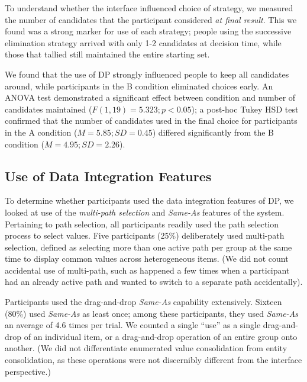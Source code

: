 \documentclass{sigchi}
\begin{document}
To understand whether the interface influenced choice of strategy, we measured the number of candidates that the participant considered \emph{at final result}.  This we found was a strong marker for use of each strategy; people using the successive elimination strategy arrived with only 1-2 candidates at decision time, while those that tallied still maintained the entire starting set.  

We found that the use of DP strongly influenced people to keep all candidates around, while participants in the B condition eliminated choices early.  An ANOVA test demonstrated a significant effect between condition and number of candidates maintained ($F(1,19)=5.323; p<0.05$); a post-hoc Tukey HSD test confirmed that the number of candidates used in the final choice for participants in the A condition ($M=5.85;SD=0.45$) differed significantly from the B condition ($M=4.95; SD=2.26$).

\subsection{Use of Data Integration Features}

To determine whether participants used the data integration features of DP, we looked at use of the \emph{multi-path selection} and \emph{Same-As} features of the system.   Pertaining to path selection, all participants readily used the path selection process to select values.   Five participants (25\%) deliberately used multi-path selection, defined as selecting more than one active path per group at the same time to display common values across heterogeneous items. (We did not count accidental use of multi-path, such as happened a few times when a participant had an already active path and wanted to switch to a separate path accidentally).

Participants used the drag-and-drop \emph{Same-As} capability extensively. Sixteen (80\%) used \emph{Same-As} as least once; among these participants, they used \emph{Same-As} an average of 4.6 times per trial. We counted a single ``use'' as a single drag-and-drop of an individual item, or a drag-and-drop operation of an entire group onto another.  (We did not differentiate enumerated value consolidation from entity consolidation, as these operations were not discernibly different from the interface perspective.)

\end{document}
